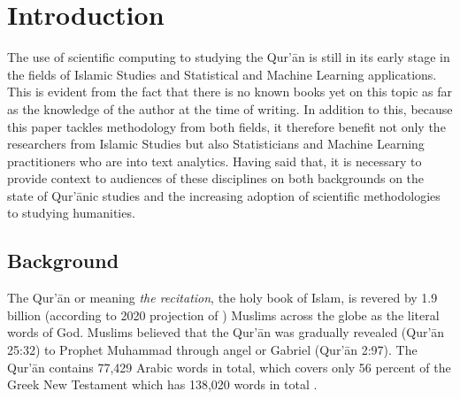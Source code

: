\chapter{Introduction}
\label{ch:introduction}
The use of scientific computing to studying the Qur'\=an is still in its early stage in the fields of Islamic Studies and Statistical and Machine Learning applications. This is evident from the fact that there is no known books yet on this topic as far as the knowledge of the author at the time of writing. In addition to this, because this paper tackles methodology from both fields, it therefore benefit not only the researchers from Islamic Studies but also Statisticians and Machine Learning practitioners who are into text analytics. Having said that, it is necessary to provide context to audiences of these disciplines on both backgrounds on the state of Qur'\=anic studies and the increasing adoption of scientific methodologies to studying humanities.
\section{Background}
The Qur'\=an or   meaning \textit{the recitation}, the holy book of Islam, is revered by 1.9 billion (according to 2020 projection of ) Muslims across the globe as the literal words of God. Muslims believed that the Qur'\=an was gradually revealed (Qur'\=an 25:32) to Prophet Muhammad  through angel   or Gabriel (Qur'\=an 2:97). The Qur'\=an contains 77,429 Arabic words in total, which covers only 56 percent of the Greek New Testament which has 138,020 words in total \cite[p.~11]{sinai2017}. 

